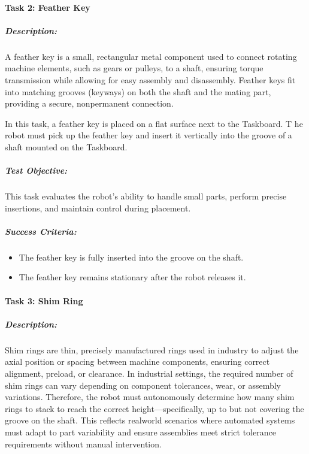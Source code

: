 \documentclass[letterpaper,10pt,english]{sphinxmanual}
\begin{document}
\paragraph{Task 2: Feather Key}
\label{\detokenize{robotic_instructions_pick_and_place:task-2-feather-key}}

\subparagraph{Description:}
\label{\detokenize{robotic_instructions_pick_and_place:id1}}
\sphinxAtStartPar
A feather key is a small, rectangular metal component used to connect rotating machine elements, such as gears or pulleys, to a shaft,
ensuring torque transmission while allowing for easy assembly and disassembly.
Feather keys fit into matching grooves (keyways) on both the shaft and the mating part, providing a secure, non\sphinxhyphen{}permanent connection.

\sphinxAtStartPar
In this task, a feather key is placed on a flat surface next to the Taskboard. T
he robot must pick up the feather key and insert it vertically into the groove of a shaft mounted on the Taskboard.


\subparagraph{Test Objective:}
\label{\detokenize{robotic_instructions_pick_and_place:id2}}
\sphinxAtStartPar
This task evaluates the robot’s ability to handle small parts,
perform precise insertions, and maintain control during placement.


\subparagraph{Success Criteria:}
\label{\detokenize{robotic_instructions_pick_and_place:id3}}\begin{itemize}
\item {} 
\sphinxAtStartPar
The feather key is fully inserted into the groove on the shaft.

\item {} 
\sphinxAtStartPar
The feather key remains stationary after the robot releases it.

\end{itemize}


\paragraph{Task 3: Shim Ring}
\label{\detokenize{robotic_instructions_pick_and_place:task-3-shim-ring}}

\subparagraph{Description:}
\label{\detokenize{robotic_instructions_pick_and_place:id4}}
\sphinxAtStartPar
Shim rings are thin, precisely manufactured rings used in industry to adjust the axial position or spacing between machine components,
ensuring correct alignment, preload, or clearance.
In industrial settings, the required number of shim rings can vary depending on component tolerances,
wear, or assembly variations. Therefore, the robot must autonomously determine how many shim rings to stack to reach the correct height—specifically,
up to but not covering the groove on the shaft.
This reflects real\sphinxhyphen{}world scenarios where automated systems
must adapt to part variability and ensure assemblies meet strict tolerance requirements without manual intervention.
\end{document}
